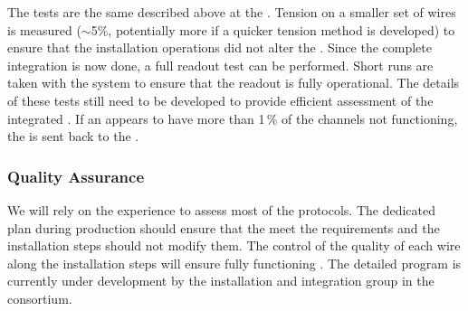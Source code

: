 
The tests are %
the same described above at the . Tension on a smaller set of wires is measured ($\sim$5\%, potentially more if a quicker tension method is developed) to ensure that the installation operations did not alter the . Since the complete integration is now done, a full readout test can be performed. Short runs are taken with the  system to ensure that the readout is fully operational. The details of these tests still need to be developed to provide efficient assessment of the integrated . If an  appears to have more than \num{1}\,\% of the channels not functioning, the  is sent back to the .

\subsubsection{Quality Assurance}

We will rely on the  experience to assess most of the  protocols. The dedicated  plan during production should ensure that the  meet the requirements and the installation steps should not modify them. The control of the quality of each wire along the installation steps will ensure fully functioning . The detailed  program is currently under development by the installation and integration group in the  consortium.


